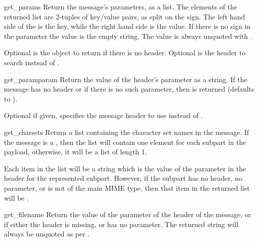 \begin{methoddesc}[Message]{get_params}{}
Return the message's  parameters, as a list.  The
elements of the returned list are 2-tuples of key/value pairs, as
split on the \character{=} sign.  The left hand side of the
\character{=} is the key, while the right hand side is the value.  If
there is no \character{=} sign in the parameter the value is the empty
string.  The value is always unquoted with .

Optional  is the object to return if there is no
 header.  Optional  is the header to
search instead of .
\end{methoddesc}

\begin{methoddesc}[Message]{get_param}{param}
Return the value of the  header's parameter
 as a string.  If the message has no 
header or if there is no such parameter, then  is
returned (defaults to ).

Optional  if given, specifies the message header to use
instead of .
\end{methoddesc}

\begin{methoddesc}[Message]{get_charsets}{}
Return a list containing the character set names in the message.  If
the message is a , then the list will contain one
element for each subpart in the payload, otherwise, it will be a list
of length 1.

Each item in the list will be a string which is the value of the
 parameter in the  header for the
represented subpart.  However, if the subpart has no
 header, no  parameter, or is not of
the  main MIME type, then that item in the returned list
will be .
\end{methoddesc}

\begin{methoddesc}[Message]{get_filename}{}
Return the value of the  parameter of the
 header of the message, or  if
either the header is missing, or has no  parameter.
The returned string will always be unquoted as per
.
\end{methoddesc}

